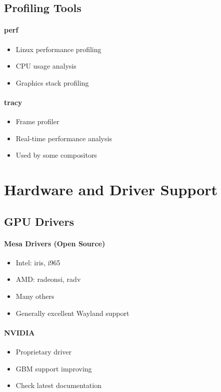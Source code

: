 \subsection{Profiling Tools}

\paragraph{perf}
\begin{itemize}
    \item Linux performance profiling
    \item CPU usage analysis
    \item Graphics stack profiling
\end{itemize}

\paragraph{tracy}
\begin{itemize}
    \item Frame profiler
    \item Real-time performance analysis
    \item Used by some compositors
\end{itemize}

\section{Hardware and Driver Support}

\subsection{GPU Drivers}

\paragraph{Mesa Drivers (Open Source)}
\begin{itemize}
    \item Intel: iris, i965
    \item AMD: radeonsi, radv
    \item Many others
    \item Generally excellent Wayland support
\end{itemize}

\paragraph{NVIDIA}
\begin{itemize}
    \item Proprietary driver
    \item GBM support improving
    \item Check latest documentation
\end{itemize}

